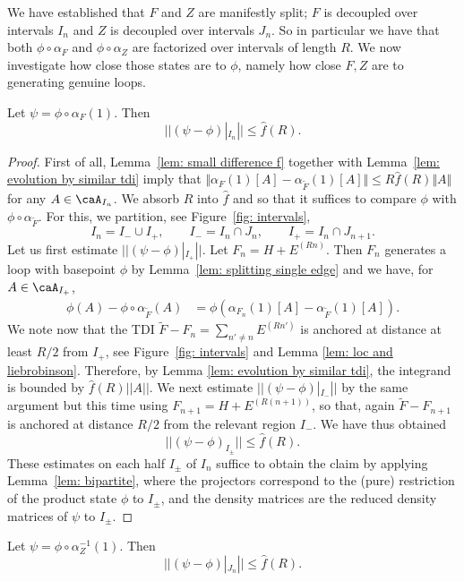 We have established that $F$ and $Z$  are manifestly split;  $F$ is decoupled over intervals $I_n$ and $Z$ is decoupled over intervals $J_n$. 
So in particular we have that both $\phi \circ \alpha_{F}$ and $\phi \circ \alpha_{Z}$ are factorized over intervals of length $R$.  
We now investigate how close those states are to $\phi$, namely how close $F, Z$ are to generating genuine loops.  
%
%
%
\begin{lemma}\label{lem: almost loop f}
	Let $\psi=\phi \circ \alpha_{F}(1)$. Then
	$$||(\psi  - \phi)|_{{I_n}}|| \leq \hat{f}(R).$$
\end{lemma}
\begin{proof}
	First of all, Lemma~\ref{lem: small difference f} together with Lemma~\ref{lem: evolution by similar tdi} imply that $\Vert \alpha_{F}(1)[A]- \alpha_{\widetilde F}(1)[A]\Vert \leq  R \hat f(R)\Vert A\Vert$ for any $A\in\caA_{I_n}$. We absorb $R$ into $\hat f$ and so that it suffices to compare $\phi$ with $\phi\circ\alpha_{\widetilde F}$. For this, we  partition, see Figure~\ref{fig: intervals},  
	$$I_n= I_- \cup I_+, \qquad  I_-=I_n \cap J_{n}, \qquad I_+=I_n \cap J_{n+1}.$$
	Let us first estimate $||(\psi-\phi)|_{I_{+}}||$.
	Let $F_n=H+E^{(Rn)}$. Then $F_n$ generates a loop with basepoint $\phi$ by Lemma~\ref{lem: splitting single edge} and we have, for $A\in \caA_{I_+}$,
	\begin{align}
		\phi(A)-\phi\circ\alpha_{\widetilde F}(A)& = \phi(\alpha_{F_n}(1)[A]- \alpha_{\widetilde F}(1)[A] ).
	\end{align}
	We note now that the TDI $\widetilde F-F_n=\sum_{n'\neq n } E^{(Rn')}$ is anchored at distance at least $R/2$ from $I_+$, see Figure~\ref{fig: intervals} and Lemma \ref{lem: loc and liebrobinson}.  Therefore, by Lemma \ref{lem: evolution by similar tdi},  the integrand is bounded by  $\hat{f}(R) ||A ||$.
	We next estimate $||(\psi-\phi)|_{I_{-}}||$ by the same argument but this time using $F_{n+1}=H+E^{(R(n+1))}$, so that, again $\widetilde F-F_{n+1}$ is anchored at distance $R/2$ from the relevant region $I_-$.  We have thus obtained 
	$$
	||(\psi-\phi)_{I_{\pm}}||  \leq \hat{f}(R).
	$$
	These estimates on each half $I_\pm$ of $I_n$ suffice to obtain the claim by applying Lemma~\ref{lem: bipartite}, where the projectors correspond to the (pure) restriction of the product state $\phi$ to $I_\pm$, and the density matrices are the reduced density matrices of $\psi$ to $I_\pm$.
\end{proof}
%
%
%
\begin{lemma}\label{lem: almost loop k}
	Let $\psi=\phi \circ \alpha_{Z}^{-1}(1)$. Then
	$$||(\psi  -\phi)|_{J_n}|| \leq \hat{f}(R).$$
\end{lemma}
